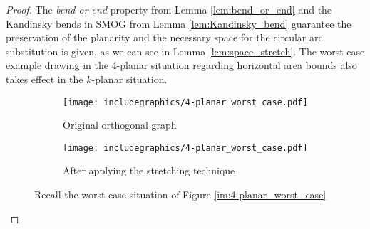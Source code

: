 \begin{proof}
	The \textit{bend or end} property from Lemma \ref{lem:bend_or_end} and the Kandinsky bends in SMOG from Lemma \ref{lem:Kandinsky_bend} guarantee the preservation of the planarity and the necessary space for the circular arc substitution is given, as we can see in Lemma \ref{lem:space_stretch}. The worst case example drawing in the 4-planar situation regarding horizontal area bounds also takes effect in the $k$-planar situation.
	\begin{figure}[H]
		\centering
		\begin{subfigure}{.4\textwidth}
			\centering
			\texttt{[image: includegraphics/4-planar\_worst\_case.pdf]}
			\caption{Original orthogonal graph}	
		\end{subfigure}
		\begin{subfigure}{.6\textwidth}
			\centering
			\texttt{[image: includegraphics/4-planar\_worst\_case.pdf]}
			\caption{After applying the stretching technique}
		\end{subfigure}
		\caption{Recall the worst case situation of Figure \ref{im:4-planar_worst_case}}
	\end{figure}
\end{proof}
